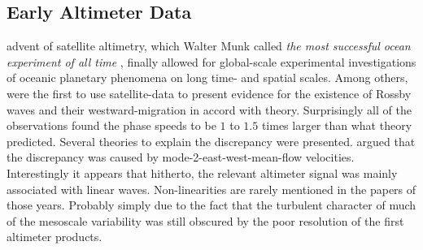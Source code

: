 






\subsection{Early Altimeter Data}\label{sec:hist_killworth}

  advent of satellite altimetry, which Walter Munk called \textit{the most successful ocean experiment of all time} \citep{munk2002}, finally allowed for
global-scale experimental investigations of oceanic planetary phenomena on long time- and spatial scales. Among others,
\citet{matano1993seasonal,cipollini1997concurrent,le1993sea} were the first to use satellite-data to present evidence for the existence of Rossby waves and their
westward-migration in accord with theory. Surprisingly all of the observations found the phase speeds to be $1$ to $1.5$ times larger than what theory
predicted. Several theories to explain the discrepancy were presented. \Eg \citet{Killworth1997a} argued that the discrepancy was caused by
mode-2-east-west-mean-flow velocities. Interestingly it appears that hitherto, the relevant altimeter signal was mainly associated with linear waves.
Non-linearities are rarely mentioned in the papers of those years. Probably simply due to the fact that the turbulent character of much of the
mesoscale variability was still obscured by the poor resolution of the first altimeter products.

